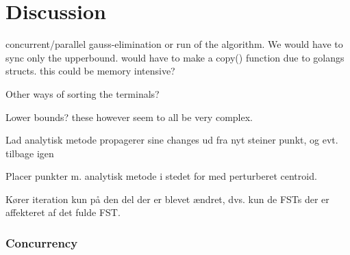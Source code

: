 {
\abnormalparskip{0pt}
\chapter{Discussion}
\label{cha:discussion}
}

concurrent/parallel gauss-elimination or run of the algorithm. We would have to
sync only the upperbound. would have to make a copy() function due to golangs
structs. this could be memory intensive?

Other ways of sorting the terminals?

Lower bounds? these however seem to all be very complex.

Lad analytisk metode propagerer sine changes ud fra nyt steiner punkt, og
evt. tilbage igen

Placer punkter m. analytisk metode i stedet for med perturberet centroid.

Kører iteration kun på den del der er blevet ændret, dvs. kun de FSTs der er
affekteret af det fulde FST.

\subsection{Concurrency}
\label{sec:concurrency}



